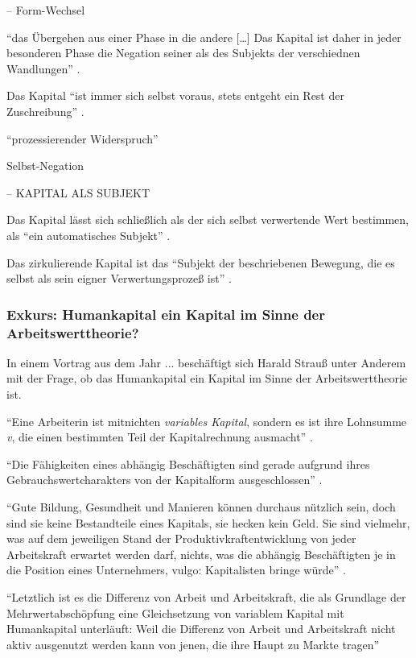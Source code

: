 \documentclass[12pt,
               DIV13,
               paper=a4,
               twoside=false,
               onehalfspacing,
               bibliography=totoc,
               toc=graduated,
               draft,
               ]{scrartcl}
\newcommand{\lips}{\dots\unkern}
\newcommand{\pc}[2]{\parencite[#1]{#2}}
\newcommand{\zn}[3]{\parencite[#1, zit. nach][#2]{#3}}
\begin{document}
-- Form-Wechsel

"`das Übergehen aus einer Phase in die andere [\lips] Das Kapital ist
daher in jeder besonderen Phase die Negation seiner als des Subjekts
der verschiednen Wandlungen"' \zn{Marx}{181}{reichelt}.

Das Kapital "`ist immer sich selbst voraus, stets entgeht ein Rest der
Zuschreibung"' \pc{125}{strauss}.

"`prozessierender Widerspruch"'

Selbst-Negation

-- KAPITAL ALS SUBJEKT

Das Kapital lässt sich schließlich als der sich selbst verwertende
Wert bestimmen, als "`ein automatisches Subjekt"' \pc{169}{kap}.

Das zirkulierende Kapital ist das "`Subjekt der beschriebenen
Bewegung, die es selbst als sein eigner Verwertungsprozeß ist"'
\zn{Marx}{181}{reichelt}.

\subsubsection{Exkurs: Humankapital ein Kapital im Sinne der
Arbeitswerttheorie?}

In einem Vortrag aus dem Jahr ... beschäftigt sich Harald Strauß unter
Anderem mit der Frage, ob das Humankapital ein Kapital im Sinne der
Arbeitswerttheorie ist.

"`Eine Arbeiterin ist mitnichten \emph{variables Kapital}, sondern es
ist ihre Lohnsumme \emph{v}, die einen bestimmten Teil der
Kapitalrechnung ausmacht"' \pc{126}{strauss}.

"`Die Fähigkeiten eines abhängig Beschäftigten sind gerade aufgrund
ihres Gebrauchswertcharakters von der Kapitalform ausgeschlossen"'
\pc{126}{strauss}.

"`Gute Bildung, Gesundheit und Manieren können durchaus nützlich sein,
doch sind sie keine Bestandteile eines Kapitals, sie hecken kein Geld.
Sie sind vielmehr, was auf dem jeweiligen Stand der
Produktivkraftentwicklung von jeder Arbeitskraft erwartet werden darf,
nichts, was die abhängig Beschäftigten je in die Position eines
Unternehmers, vulgo: Kapitalisten bringe würde"' \pc{128}{strauss}.

"`Letztlich ist es die Differenz von Arbeit und Arbeitskraft, die als
Grundlage der Mehrwertabschöpfung eine Gleichsetzung von variablem
Kapital mit Humankapital unterläuft: Weil die Differenz von Arbeit und
Arbeitskraft nicht aktiv ausgenutzt werden kann von jenen, die ihre
Haupt zu Markte tragen"' \pc{126}{strauss}
\end{document}
